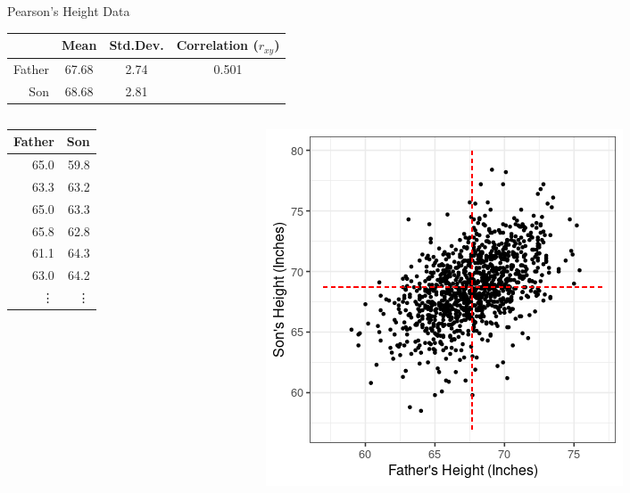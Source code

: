\documentclass{beamer}
\begin{document}
\begin{frame}{Pearson's Height Data}

\begin{table}[ht]
\centering
\footnotesize
\begin{tabular}{rccc}
  \hline
& Mean & Std.Dev. & Correlation ($r_{xy}$)\\ 
  \hline
Father & 67.68 & 2.74 & \multirow{2}{*}{0.501} \\ 
Son &  68.68 & 2.81 & \\ 
   \hline
\end{tabular}
\end{table}

\begin{columns}

  \begin{column}{0.3\textwidth}
\begin{table}[ht]
\centering
\begin{tabular}{rr}
  \hline
Father & Son \\ 
  \hline
65.0 & 59.8 \\ 
  63.3 & 63.2 \\ 
  65.0 & 63.3 \\ 
  65.8 & 62.8 \\ 
  61.1 & 64.3 \\ 
  63.0 & 64.2 \\  
  \vdots & \vdots \\
   \hline
\end{tabular}
\end{table}
  \end{column}
  \begin{column}{0.5\textwidth}
\begin{center}
\includegraphics[scale=0.4]{father_son.png}
\end{center}
  \end{column}
\end{columns}
\end{frame}
\end{document}
